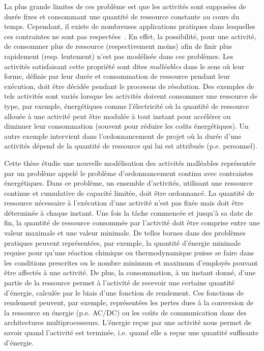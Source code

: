 La plus grande limites de ces problème est que les activités sont
supposées de durée fixes et consommant une quantité de ressource
constante au cours du temps. Cependant, il existe de nombreuses
applications pratiques dans lesquelles ces contraintes ne sont pas
respectées~\cite{HaitArtiguesLopez,Blaz,W80}. En effet, la
possibilité, pour une activité, de consommer plus de ressource
(respectivement moins) afin de finir plus rapidement (resp. lentement)
n'est pas modélisée dans ces problèmes. Les activités satisfaisant
cette propriété sont dites {\it malléables} dans le sens où leur
forme, définie par leur durée et consommation de ressource pendant
leur exécution, doit être décidée pendant le processus de
résolution. Des exemples de tels activités sont variés lorsque les
activités doivent consommer une ressource de type, par
exemple, énergétiques comme l'électricité où la quantité de ressource
allouée à une activité peut être modulée à tout instant pour accélérer
ou diminuer leur consommation (souvent pour réduire les coûts
énergétiques). Un autre exemple intervient dans l'ordonnancement de
projet où la durée d'une activités dépend de la quantité de ressource
qui lui est attribuée (p.e. personnel). 

Cette thèse étudie une nouvelle modélisation des activités malléables
représentée par un problème appelé le problème d'ordonnancement
continu avec contraintes énergétiques. Dans ce problème, un ensemble
d'activités,  utilisant une ressource continue et cumulative de
capacité limitée, doit être ordonnancé. La quantité de ressource
nécessaire à l'exécution d'une activité n'est pas fixée mais doit
être déterminée à chaque instant. Une fois la tâche commencée et
jusqu'à sa date de fin, la quantité de ressource consommée par
l'activité doit être comprise entre une valeur maximale et une valeur
minimale. De telles bornes dans des problèmes pratiques
peuvent représentées, par exemple, la quantité d'énergie
minimale requise pour qu'une réaction chimique ou thermodynamique
puisse se faire dans les conditions prescrites ou le nombre minimum et
maximum d'employés pouvant être affectés à une activité.
De plus, la consommation, à un instant donné, d'une partie
de la ressource permet à l'activité de recevoir une certaine quantité
d'énergie, calculée par le biais d'une fonction de rendement. Ces
fonctions de rendement peuvent, par exemple, représentées les pertes
dues à la conversion de la ressource en énergie (p.e. AC/DC) ou les
coûts de communication dans des architectures multiprocesseurs. 
L'énergie reçue par une activité nous permet de savoir quand
l'activité est terminée, i.e. quand elle a reçue une quantité
suffisante d'énergie. 

